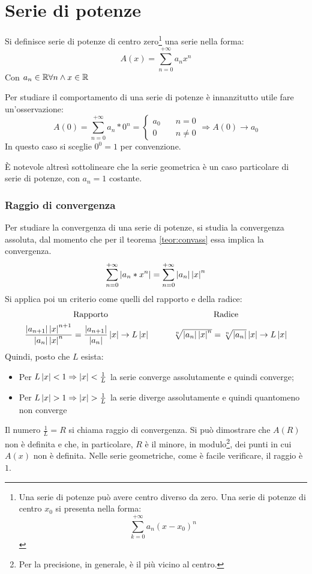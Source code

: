\section{Serie di potenze}
\begin{defin}
	Si definisce serie di potenze di centro zero\footnote{Una serie di potenze può avere centro diverso da zero. Una serie di potenze di centro $x_0$ si presenta nella forma:
		\[
			\sum_{k=0}^{+\infty} a_n (x-x_0)^n
		\]} una serie nella forma:
	\[
		A(x)=\sum_{n=0}^{+\infty} a_n x^n
	\]
	Con $a_n\in\mathbb{R}\forall n\land x\in\mathbb{R}$
\end{defin}
Per studiare il comportamento di una serie di potenze è innanzitutto utile fare un'osservazione:
\[
	A(0)=\sum_{n=0}^{+\infty} a_n*0^n=
	\begin{cases}
		a_0\quad & n=0    \\
		0 \quad  & n\neq0
	\end{cases}\Rightarrow A(0)\to a_0
\]
In questo caso si sceglie $0^0=1$ per convenzione.

È notevole altresì sottolineare che la serie geometrica è un caso particolare di serie di potenze, con $a_n=1$ costante.

\subsubsection{Raggio di convergenza}
Per studiare la convergenza di una serie di potenze, si studia la convergenza assoluta, dal momento che per il teorema \ref{teor:convass} essa implica la convergenza.
\[
	\sum_{n=0}^{+\infty}\left\lvert a_n*x^n \right\rvert=\sum_{n=0}^{+\infty}\left\lvert a_n \right\rvert\left\lvert x \right\rvert^n
\]
Si applica poi un criterio come quelli del rapporto e della radice:
\[
	\begin{array}{cc}
		\text{Rapporto}                                                                                                 & \text{Radice}                                                            \\[1ex]
		\dfrac{\left\lvert a_{n+1} \right\rvert\left\lvert x \right\rvert^{n+1}}{\left\lvert a_n \right\rvert\left\lvert x \right\rvert^n}=\dfrac{\left\lvert a_{n+1} \right\rvert}{\left\lvert a_n \right\rvert}\left\lvert x \right\rvert\to L\left\lvert x \right\rvert\quad & \quad\sqrt[n]{\left\lvert a_n \right\rvert\left\lvert x \right\rvert^n}=\sqrt[n]{\left\lvert a_n \right\rvert}\left\lvert x \right\rvert\to L\left\lvert x \right\rvert
	\end{array}
\]
Quindi, posto che $L$ esista:
\begin{itemize}
	\item Per $L\left\lvert x \right\rvert<1\Rightarrow \left\lvert x \right\rvert<\frac{1}{L}$ la serie converge assolutamente e quindi converge;
	\item Per $L\left\lvert x \right\rvert>1\Rightarrow \left\lvert x \right\rvert>\frac{1}{L}$ la serie diverge assolutamente e quindi quantomeno non converge
\end{itemize}
Il numero $\frac{1}{L}=R$ si chiama raggio di convergenza. Si può dimostrare che $A(R)$ non è definita e che, in particolare, $R$ è il minore, in modulo\footnote{Per la precisione, in generale, è il più vicino al centro.}, dei punti in cui $A(x)$ non è definita. Nelle serie geometriche, come è facile verificare, il raggio è $1$.

